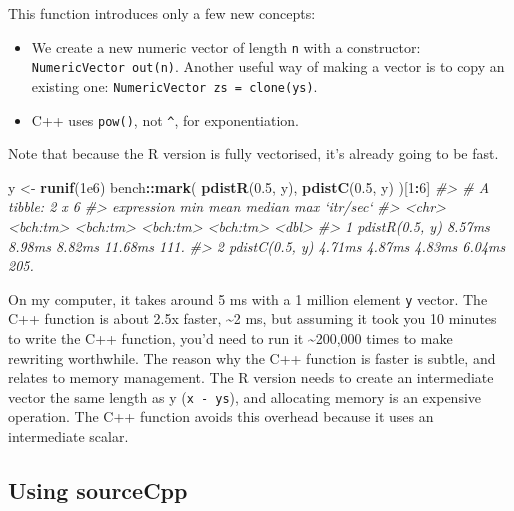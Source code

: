 \documentclass[]{book}
\newenvironment{Shaded}{\begin{snugshade}}{\end{snugshade}}
\newcommand{\CommentTok}[1]{\textcolor[rgb]{0.37,0.37,0.37}{\textit{#1}}}
\newcommand{\DecValTok}[1]{\textcolor[rgb]{0.06,0.06,0.06}{#1}}
\newcommand{\FloatTok}[1]{\textcolor[rgb]{0.06,0.06,0.06}{#1}}
\newcommand{\KeywordTok}[1]{\textcolor[rgb]{0.27,0.27,0.27}{\textbf{#1}}}
\newcommand{\NormalTok}[1]{#1}
\newcommand{\OperatorTok}[1]{\textcolor[rgb]{0.43,0.43,0.43}{\textbf{#1}}}
\newcommand{\StringTok}[1]{\textcolor[rgb]{0.5,0.5,0.5}{#1}}
\begin{document}
This function introduces only a few new concepts:

\begin{itemize}
\item
  We create a new numeric vector of length \texttt{n} with a constructor:
  \texttt{NumericVector\ out(n)}. Another useful way of making a vector is to copy an
  existing one: \texttt{NumericVector\ zs\ =\ clone(ys)}.
\item
  C++ uses \texttt{pow()}, not \texttt{\^{}}, for exponentiation.
\end{itemize}

Note that because the R version is fully vectorised, it's already going to be fast.

\begin{Shaded}
\begin{Highlighting}[]
\NormalTok{y <-}\StringTok{ }\KeywordTok{runif}\NormalTok{(}\FloatTok{1e6}\NormalTok{)}
\NormalTok{bench}\OperatorTok{::}\KeywordTok{mark}\NormalTok{(}
  \KeywordTok{pdistR}\NormalTok{(}\FloatTok{0.5}\NormalTok{, y),}
  \KeywordTok{pdistC}\NormalTok{(}\FloatTok{0.5}\NormalTok{, y)}
\NormalTok{)[}\DecValTok{1}\OperatorTok{:}\DecValTok{6}\NormalTok{]}
\CommentTok{#> # A tibble: 2 x 6}
\CommentTok{#>   expression          min     mean   median      max `itr/sec`}
\CommentTok{#>   <chr>          <bch:tm> <bch:tm> <bch:tm> <bch:tm>     <dbl>}
\CommentTok{#> 1 pdistR(0.5, y)   8.57ms   8.98ms   8.82ms  11.68ms      111.}
\CommentTok{#> 2 pdistC(0.5, y)   4.71ms   4.87ms   4.83ms   6.04ms      205.}
\end{Highlighting}
\end{Shaded}

On my computer, it takes around 5 ms with a 1 million element \texttt{y} vector. The C++ function is about 2.5x faster, \textasciitilde{}2 ms, but assuming it took you 10 minutes to write the C++ function, you'd need to run it \textasciitilde{}200,000 times to make rewriting worthwhile. The reason why the C++ function is faster is subtle, and relates to memory management. The R version needs to create an intermediate vector the same length as y (\texttt{x\ -\ ys}), and allocating memory is an expensive operation. The C++ function avoids this overhead because it uses an intermediate scalar.

\hypertarget{sourceCpp}{%
\subsection{Using sourceCpp}\label{sourceCpp}}
\end{document}
